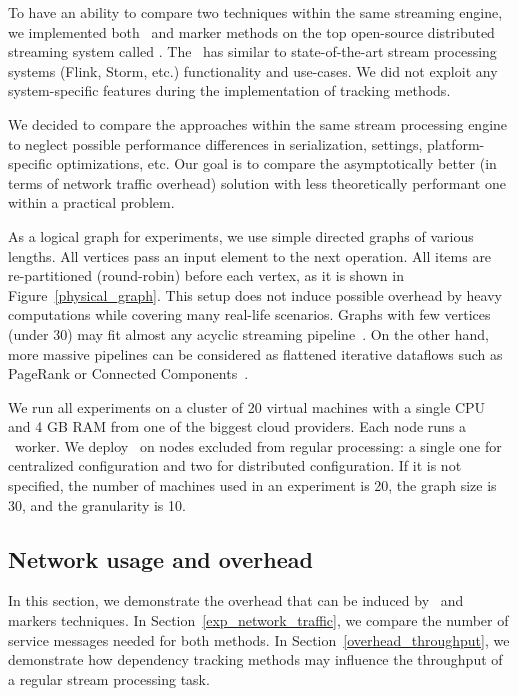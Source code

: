 To have an ability to compare two techniques within the same streaming engine, we implemented both \tracker\ and marker methods on the top open-source distributed streaming system called \FlameStream. The  \FlameStream\ has similar to state-of-the-art stream processing systems (Flink, Storm, etc.) functionality and use-cases. We did not exploit any system-specific features during the implementation of tracking methods.

We decided to compare the approaches within the same stream processing engine to neglect possible performance differences in serialization, settings, platform-specific optimizations, etc. Our goal is to compare the asymptotically better (in terms of network traffic overhead) solution with less theoretically performant one within a practical problem.

As a logical graph for experiments, we use simple directed graphs of various lengths. All vertices pass an input element to the next operation. All items are re-partitioned (round-robin) before each vertex, as it is shown in Figure~\ref{physical_graph}. This setup does not induce possible overhead by heavy computations while covering many real-life scenarios. Graphs with few vertices (under 30) may fit almost any acyclic streaming pipeline~\cite{akidau2018streaming}. On the other hand, more massive pipelines can be considered as flattened iterative dataflows such as PageRank or Connected Components~\cite{Murray:2013:NTD:2517349.2522738, xu2016efficient}.

We run all experiments on a cluster of 20 virtual machines with a single CPU and 4 GB RAM from one of the biggest cloud providers. Each node runs a \FlameStream\ worker. We deploy \tracker\ on nodes excluded from regular processing: a single one for centralized configuration and two for distributed configuration. If it is not specified, the number of machines used in an experiment is 20, the graph size is 30, and the granularity is 10. 

\subsection{Network usage and overhead} \label{overhead}

In this section, we demonstrate the overhead that can be induced by \tracker\ and markers techniques. In Section~\ref{exp_network_traffic}, we compare the number of service messages needed for both methods. In Section~\ref{overhead_throughput}, we demonstrate how dependency tracking methods may influence the throughput of a regular stream processing task.

